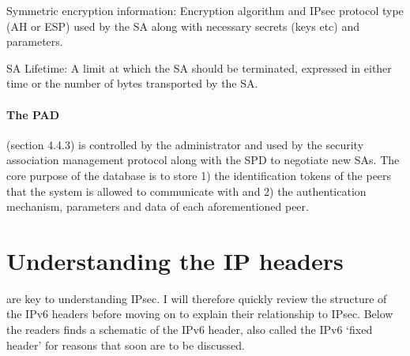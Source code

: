 \documentclass[final,a4paper,twoside,11pt,onecolumn]{report}
\begin{document}
Symmetric encryption information: Encryption algorithm and IPsec protocol type (AH or ESP) used by the SA along with necessary secrets (keys etc) and parameters.

SA Lifetime: A limit at which the SA should be terminated, expressed in either time or the number of bytes transported by the SA.



\paragraph{The PAD} (section 4.4.3) is controlled by the administrator and used by the security association management protocol along with the SPD to negotiate new SAs. The core purpose of the database is to store 1) the identification tokens of the peers that the system is allowed to communicate with and 2) the authentication mechanism, parameters and data of each aforementioned peer.



% 

% 


\section{Understanding the IP headers} are key to understanding IPsec. I will therefore quickly review the structure of the IPv6 headers before moving on to explain their relationship to IPsec. Below the readers finds a schematic of the IPv6 header, also called the IPv6 `fixed header' for reasons that soon are to be discussed.
\end{document}
